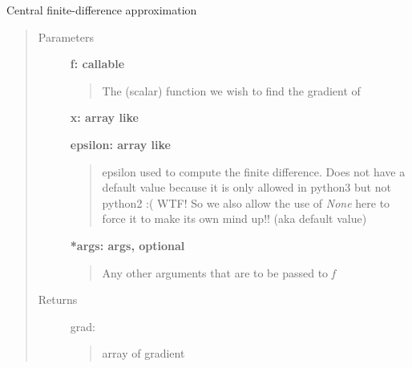 \documentclass[letterpaper,10pt,english]{sphinxmanual}
\begin{document}
\begin{fulllineitems}
Central finite-difference approximation
\begin{quote}\begin{description}
\item[{Parameters}] \leavevmode
\textbf{f: callable}
\begin{quote}

The (scalar) function we wish to find the gradient of
\end{quote}

\textbf{x: array like}

\textbf{epsilon: array like}
\begin{quote}

epsilon used to compute the finite difference.  Does not 
have a default value because it is only allowed in 
python3 but not python2 :( WTF!  So we also allow the
use of \emph{None} here to force it to make its own mind
up!! (aka default value)
\end{quote}

\textbf{*args: args, optional}
\begin{quote}

Any other arguments that are to be passed to \emph{f}
\end{quote}

\item[{Returns}] \leavevmode
grad: \href{http://docs.scipy.org/doc/numpy/reference/generated/numpy.ndarray.html\#numpy.ndarray}{}
\begin{quote}

array of gradient
\end{quote}

\end{description}\end{quote}

\end{fulllineitems}
\end{document}
